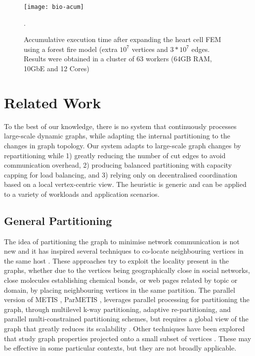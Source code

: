 \documentclass{sig-alternate-10pt}
\begin{document}
\begin{figure}[t]
\centering


   \texttt{[image: bio-acum]}
   \caption{Accumulative execution time after expanding the heart cell FEM using a forest fire model (extra $10^7$ vertices and $3*10^7$ edges. Results were obtained in a cluster of 63 workers (64GB RAM, 10GbE and 12 Cores)}.
\vspace{-20pt}
\label{fig:bio}
\end{figure}




\section{Related Work}
\label{sec:related}


To the best of our knowledge, there is no system that continuously processes large-scale dynamic graphs, while adapting the internal partitioning to the changes in graph topology. Our system adapts to large-scale graph changes by repartitioning while 1) greatly reducing the number of cut edges to avoid communication overhead, 2) producing balanced partitioning with capacity capping for load balancing, and 3) relying only on decentralised coordination based on a local vertex-centric view. The heuristic is generic and can be applied to a variety of workloads and application scenarios. 

\subsection{General Partitioning}

The idea of partitioning the graph to minimise network communication is not new and it has inspired several techniques to co-locate neighbouring vertices in the same host \cite{Bhatt1983, Pellegrini1996, Karypis1998,Newman06,Blondel2008,Arora2009,DasSarma2010}. These approaches try to exploit the locality present in the graphs, whether due to the vertices being geographically close in social networks, close molecules establishing chemical bonds, or web pages related by topic or domain, by placing neighbouring vertices in the same partition. The parallel version of METIS \cite{metis}, ParMETIS \cite{parmetis}, leverages parallel processing for partitioning the graph, through multilevel k-way partitioning, adaptive re-partitioning, and parallel multi-constrained partitioning schemes, but requires a global view of the graph that  greatly reduces its scalability \cite{Salihoglu2012}. Other techniques have been explored that study graph properties projected onto a small subset of vertices \cite{Leskovec2007,DasSarma2010}. These may be effective in some particular contexts, but they are not broadly applicable. 
\end{document}
